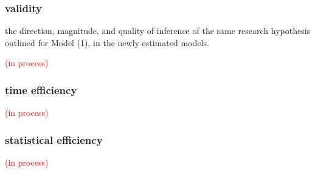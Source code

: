 \subsubsection{validity}
%
the direction, magnitude, and quality of inference of the same research hypothesis outlined for Model (1), in the newly estimated models.

\textcolor{red}{(in process)}

\begin{comment}
	correlate latent scores (from different methods) with entropy measures (see research proposal)
	
	\textbf{critique:} What about decision statements or think at loud rating process? (is it possible), \citet{Lesterhuis_2018} has shown their usefulness, while \citet{Boonen_et_al_2020} signals the need to know about the inner working of judgment processes.
\end{comment}
%
%
\subsubsection{time efficiency}
%
\textcolor{red}{(in process)}

\begin{comment}
	time needed for each judgement based on method from (Coertjens_et_al_2017).
	
	statistical efficiency has been researched on \citet{Leijon_et_al_2019} and \citet{Pritikin_2020} for the bayesian dichotomous BTL model and the ordinal BTL model, respectively.
\end{comment}
%
%
\subsubsection{statistical efficiency}
%
\textcolor{red}{(in process)}
